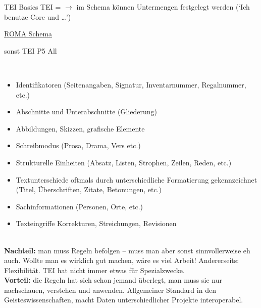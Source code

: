 \begin{frame}[allowframebreaks]{TEI Basics}
\footnotesize
TEI =  $\to$ im Schema können Untermengen festgelegt werden (`Ich benutze Core und \dots ') \item \href{http://www.tei-c.org/Roma/}{ROMA Schema} \item sonst TEI P5 All
\smallskip

 \\

\begin{itemize}\footnotesize
    \item Identifikatoren (Seitenangaben, Signatur, Inventarnummer, Regalnummer, etc.)
    \item Abschnitte und Unterabschnitte (Gliederung)
    \item Abbildungen, Skizzen, grafische Elemente
    \item Schreibmodus (Prosa, Drama, Vers etc.)
    \item Strukturelle Einheiten (Absatz, Listen, Strophen, Zeilen, Reden, etc.)
    \item Textunterschiede oftmals durch unterschiedliche Formatierung gekennzeichnet (Titel, Überschriften, Zitate, Betonungen, etc.)
    \item Sachinformationen (Personen, Orte, etc.)
    \item Texteingriffe Korrekturen, Streichungen, Revisionen
\end{itemize}
\vspace{1em}

 \\
\textbf{Nachteil:} man muss Regeln befolgen -- muss man aber sonst sinnvollerweise eh auch. Wollte man es wirklich gut machen, wäre es viel Arbeit! Andererseits: Flexibilität. TEI hat nicht immer etwas für Spezialzwecke. \\
\textbf{Vorteil:} die Regeln hat sich schon jemand überlegt, man muss sie nur nachschauen, verstehen und anwenden. Allgemeiner Standard in den Geisteswissenschaften, macht Daten unterschiedlicher Projekte interoperabel.
\end{frame}





